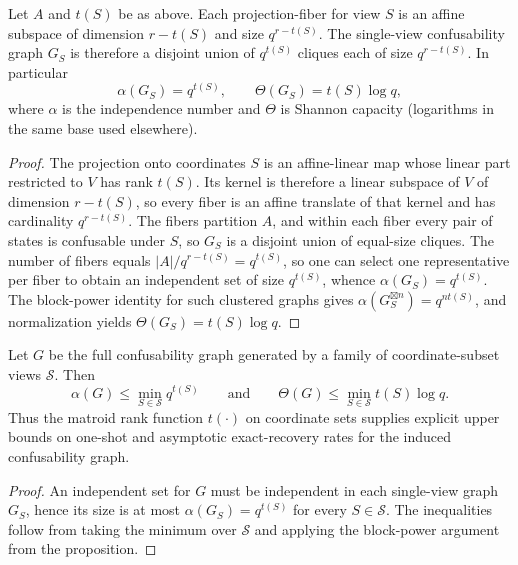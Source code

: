 \begin{proposition}
Let $A$ and $t(S)$ be as above. Each projection-fiber for view $S$ is an affine subspace of dimension $r-t(S)$ and size $q^{r-t(S)}$. The single-view confusability graph $G_S$ is therefore a disjoint union of $q^{t(S)}$ cliques each of size $q^{r-t(S)}$. In particular
\[
\alpha(G_S)=q^{t(S)},\qquad \Theta(G_S)=t(S)\log q,
\]
where $\alpha$ is the independence number and $\Theta$ is Shannon capacity (logarithms in the same base used elsewhere).
\end{proposition}

\begin{proof}
The projection onto coordinates $S$ is an affine-linear map whose linear part restricted to $V$ has rank $t(S)$. Its kernel is therefore a linear subspace of $V$ of dimension $r-t(S)$, so every fiber is an affine translate of that kernel and has cardinality $q^{r-t(S)}$. The fibers partition $A$, and within each fiber every pair of states is confusable under $S$, so $G_S$ is a disjoint union of equal-size cliques. The number of fibers equals $|A|/q^{r-t(S)}=q^{t(S)}$, so one can select one representative per fiber to obtain an independent set of size $q^{t(S)}$, whence $\alpha(G_S)=q^{t(S)}$. The block-power identity for such clustered graphs gives $\alpha(G_S^{\boxtimes n})=q^{nt(S)}$, and normalization yields $\Theta(G_S)=t(S)\log q$.
\end{proof}

\begin{corollary}\label{cor:matroid-capacity-bounds}
Let $G$ be the full confusability graph generated by a family of coordinate-subset views $\mathcal S$. Then
\[
\alpha(G)\le \min_{S\in\mathcal S} q^{t(S)}
\qquad\text{and}\qquad
\Theta(G) \le \min_{S\in\mathcal S} t(S)\log q.
\]
Thus the matroid rank function $t(\cdot)$ on coordinate sets supplies explicit upper bounds on one-shot and asymptotic exact-recovery rates for the induced confusability graph.
\end{corollary}

\begin{proof}
An independent set for $G$ must be independent in each single-view graph $G_S$, hence its size is at most $\alpha(G_S)=q^{t(S)}$ for every $S\in\mathcal S$. The inequalities follow from taking the minimum over $\mathcal S$ and applying the block-power argument from the proposition.
\end{proof}


